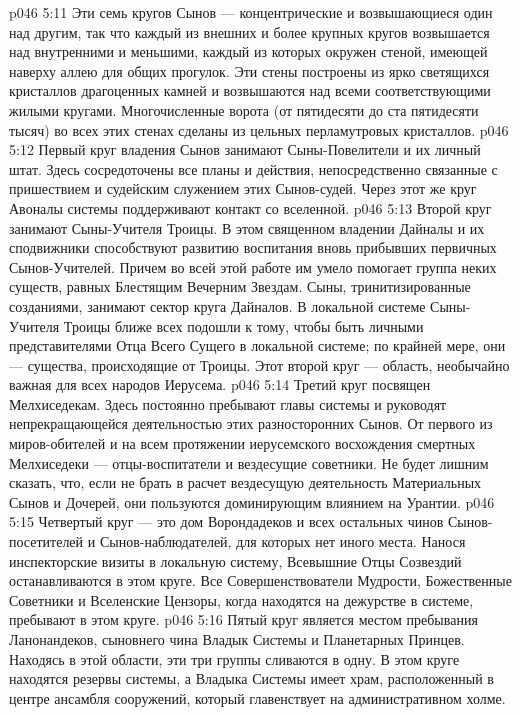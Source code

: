 \vs p046 5:11 Эти семь кругов Сынов --- концентрические и возвышающиеся один над другим, так что каждый из внешних и более крупных кругов возвышается над внутренними и меньшими, каждый из которых окружен стеной, имеющей наверху аллею для общих прогулок. Эти стены построены из ярко светящихся кристаллов драгоценных камней и возвышаются над всеми соответствующими жилыми кругами. Многочисленные ворота (от пятидесяти до ста пятидесяти тысяч) во всех этих стенах сделаны из цельных перламутровых кристаллов.
\vs p046 5:12 Первый круг владения Сынов занимают Сыны\hyp{}Повелители и их личный штат. Здесь сосредоточены все планы и действия, непосредственно связанные с пришествием и судейским служением этих Сынов\hyp{}судей. Через этот же круг Авоналы системы поддерживают контакт со вселенной.
\vs p046 5:13 Второй круг занимают Сыны\hyp{}Учителя Троицы. В этом священном владении Дайналы и их сподвижники способствуют развитию воспитания вновь прибывших первичных Сынов\hyp{}Учителей. Причем во всей этой работе им умело помогает группа неких существ, равных Блестящим Вечерним Звездам. Сыны, тринитизированные созданиями, занимают сектор круга Дайналов. В локальной системе Сыны\hyp{}Учителя Троицы ближе всех подошли к тому, чтобы быть личными представителями Отца Всего Сущего в локальной системе; по крайней мере, они --- существа, происходящие от Троицы. Этот второй круг --- область, необычайно важная для всех народов Иерусема.
\vs p046 5:14 Третий круг посвящен Мелхиседекам. Здесь постоянно пребывают главы системы и руководят непрекращающейся деятельностью этих разносторонних Сынов. От первого из миров\hyp{}обителей и на всем протяжении иерусемского восхождения смертных Мелхиседеки --- отцы\hyp{}воспитатели и вездесущие советники. Не будет лишним сказать, что, если не брать в расчет вездесущую деятельность Материальных Сынов и Дочерей, они пользуются доминирующим влиянием на Урантии.
\vs p046 5:15 Четвертый круг --- это дом Ворондадеков и всех остальных чинов Сынов\hyp{}посетителей и Сынов\hyp{}наблюдателей, для которых нет иного места. Нанося инспекторские визиты в локальную систему, Всевышние Отцы Созвездий останавливаются в этом круге. Все Совершенствователи Мудрости, Божественные Советники и Вселенские Цензоры, когда находятся на дежурстве в системе, пребывают в этом круге.
\vs p046 5:16 Пятый круг является местом пребывания Ланонандеков, сыновнего чина Владык Системы и Планетарных Принцев. Находясь в этой области, эти три группы сливаются в одну. В этом круге находятся резервы системы, а Владыка Системы имеет храм, расположенный в центре ансамбля сооружений, который главенствует на административном холме.

